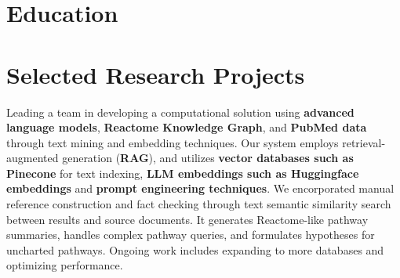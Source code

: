 \documentclass[10pt,letterpaper]{moderncv}
\begin{document}
\section{Education}

\section{Selected Research Projects}

{}{Leading a team in developing a computational solution using \textbf{advanced language models}, \textbf{Reactome Knowledge Graph}, and \textbf{PubMed data} through text mining and embedding techniques. Our system employs retrieval-augmented generation (\textbf{RAG}), and utilizes \textbf{vector databases such as Pinecone} for text indexing, \textbf{LLM embeddings such as Huggingface embeddings} and \textbf{prompt engineering techniques}. We encorporated manual reference construction and fact checking through text semantic similarity search between results and source documents. It generates Reactome-like pathway summaries, handles complex pathway queries, and formulates hypotheses for uncharted pathways. Ongoing work includes expanding to more databases and optimizing performance.}
\end{document}
